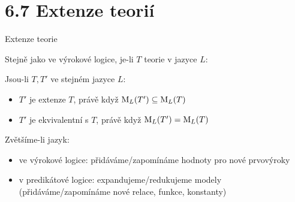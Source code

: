 \documentclass{beamer}
\begin{document}
\section{6.7 Extenze teorií}


\begin{frame}{Extenze teorie}

    Stejně jako ve výrokové logice, je-li $T$ teorie v jazyce $L$:

    
    Jsou-li $T,T'$ ve stejném jazyce $L$:
    \begin{itemize}
        \item $T'$ je extenze $T$, právě když $\operatorname{M}_L(T')\subseteq\operatorname{M}_L(T)$
        \item $T'$ je ekvivalentní s $T$, právě když $\operatorname{M}_L(T')=\operatorname{M}_L(T)$
    \end{itemize}
       
    Zvětšíme-li jazyk:
    \begin{itemize}
        \item \alert{ve výrokové logice:} přidáváme/zapomínáme hodnoty pro nové prvovýroky
        \item \alert{v predikátové logice:} expandujeme/redukujeme modely (přidáváme/zapomínáme nové relace, funkce, konstanty)
    \end{itemize}

\end{frame}
\end{document}
